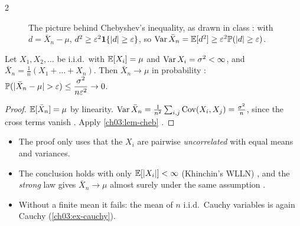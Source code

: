 \begin{paracol}{2}
\begin{figure}[ht]
\centering
{}
\caption{The picture behind Chebyshev's inequality, as drawn in class : with $d=\bar X_n-\mu$,
$d^2\ge\varepsilon^2\mathbf{1}\{|d|\ge\varepsilon\}$, so $\operatorname{Var}\bar X_n=\mathbb{E}[d^2]\ge\varepsilon^2\mathbb{P}(|d|\ge\varepsilon)$.}\label{ch03:fig-cheb}
\end{figure}

\begin{theorem}\label{ch03:thm-wlln}
Let $X_1,X_2,\dots$ be i.i.d.\ with $\mathbb{E}[X_i]=\mu$ and $\operatorname{Var} X_i=\sigma^2<\infty$, and $\bar X_n=\frac1n(X_1+\dots+X_n)$. Then
$\bar X_n\to\mu$ in probability :
$\Prob(|\bar X_n-\mu|>\varepsilon)\le\dfrac{\sigma^2}{n\varepsilon^2}\to0$.
\end{theorem}
\begin{proof}
$\mathbb{E}[\bar X_n]=\mu$ by linearity. $\operatorname{Var}\bar X_n=\frac1{n^2}\sum_{i,j}\operatorname{Cov}(X_i,X_j)=\frac{\sigma^2}n$, since the cross terms vanish
. Apply \cref{ch03:lem-cheb} .
\end{proof}

\begin{remark}
\leavevmode
\begin{itemize}
  \item The proof only uses that the $X_i$ are pairwise \emph{uncorrelated} with equal means and variances.
  \item The conclusion holds with only $\mathbb{E}[|X_i|]<\infty$ (Khinchin's WLLN) , and the \emph{strong}
        law gives $\bar X_n\to\mu$ almost surely under the same assumption .
  \item Without a finite mean it fails: the mean of $n$ i.i.d.\ Cauchy variables is again Cauchy (\cref{ch03:ex-cauchy}).
\end{itemize}
\end{remark}


\end{paracol}
